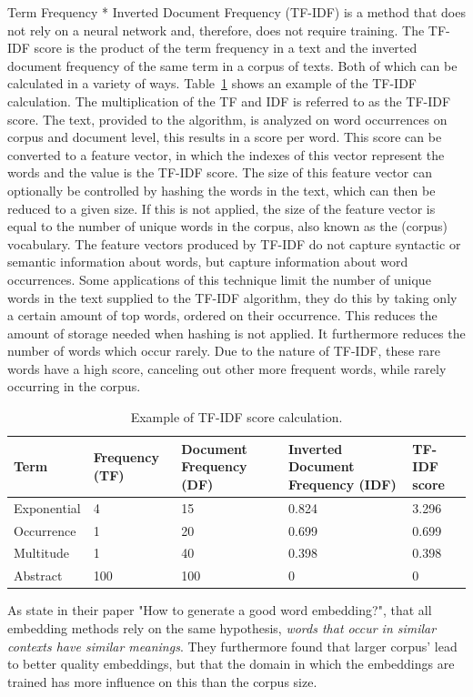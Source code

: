 \documentclass[../../Thesis.tex]{subfiles}
\begin{document}
\begin{jumpin}
Term Frequency * Inverted Document Frequency (TF-IDF) is a method that does not rely on a neural network and, therefore, does not require training. The TF-IDF score is the product of the term frequency in a text and the inverted document frequency of the same term in a corpus of texts. Both of which can be calculated in a variety of ways. Table~\ref{table:TFIDFScore} shows an example of the TF-IDF calculation. The multiplication of the TF and IDF is referred to as the TF-IDF score. The text, provided to the algorithm, is analyzed on word occurrences on corpus and document level, this results in a score per word. This score can be converted to a feature vector, in which the indexes of this vector represent the words and the value is the TF-IDF score. The size of this feature vector can optionally be controlled by hashing the words in the text, which can then be reduced to a given size. If this is not applied, the size of the feature vector is equal to the number of unique words in the corpus, also known as the (corpus) vocabulary.  The feature vectors produced by TF-IDF do not capture syntactic or semantic information about words, but capture information about word occurrences. Some applications of this technique limit the number of unique words in the text supplied to the TF-IDF algorithm, they do this by taking only a certain amount of top words, ordered on their occurrence. This reduces the amount of storage needed when hashing is not applied. It furthermore reduces the number of words which occur rarely. Due to the nature of TF-IDF, these rare words have a high score, canceling out other more frequent words, while rarely occurring in the corpus.
\vspace{0.3in}\begin{table}[hbt]
\begin{center}
\begin{tabular}{|p{1in}|p{1in}|p{1in}|p{1.3in}|p{1in}|}
\hline
Term & Frequency (TF) & Document Frequency (DF) & Inverted Document Frequency (IDF) & TF-IDF score\\
\hline
Exponential & 4 & 15 & 0.824 & 3.296\\
\hline
Occurrence & 1 & 20 & 0.699 & 0.699\\
\hline
Multitude & 1 & 40 & 0.398 & 0.398\\
\hline
Abstract & 100 & 100 & 0 & 0\\
\hline
\end{tabular}
\caption{Example of TF-IDF score calculation.}\label{table:TFIDFScore}
\end{center}
\end{table}
\FloatBarrier
\end{jumpin}
As \citet{lai2016generate} state in their paper "How to generate a good word embedding?", that all embedding methods rely on the same hypothesis, \textit{words that occur in similar contexts have similar meanings}. They furthermore found that larger corpus' lead to better quality embeddings, but that the domain in which the embeddings are trained has more influence on this than the corpus size. 
\end{document}
